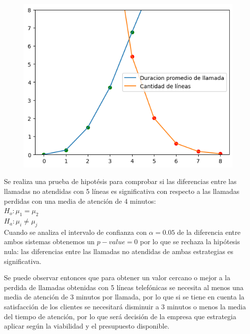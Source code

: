 \documentclass{article}
\begin{document}
			
			\begin{figure}[H]
				\centering
				\includegraphics[width=0.7\linewidth]{./output4.png}
				\label{fig:enter-label}
			\end{figure}
			
			Se realiza una prueba de hipotésis para comprobar si las diferencias entre las llamadas no atendidas con 5 líneas es significativa  con respecto a las llamadas perdidas con una media de atención de 4 minutos: \\
			$H_o: \mu_1 = \mu_2 $\\
			$H_a: \mu_i \neq \mu_j$ \\
			
			Cuando se analiza el intervalo de confianza con $\alpha=0.05$ de la diferencia entre ambos sistemas obtenemos un $p-value = 0$ por lo que se rechaza la hipótesis nula: las diferencias entre las llamadas no atendidas de ambas estrategias es significativa.
			\vspace{0.3cm}
			
			Se puede observar entonces que para obtener un valor cercano o mejor a la perdida de llamadas obtenidas con 5 líneas telefónicas se necesita al menos una media de atención de 3 minutos por llamada, por lo que si se tiene en cuenta la satisfacción de los clientes se necesitará disminuir a 3 minutos o menos la media del tiempo de atención, por lo que será decisión de la empresa que estrategia aplicar según la viabilidad y el presupuesto disponible.
			
\end{document}
